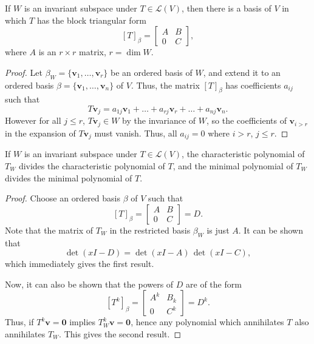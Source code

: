 \documentclass[11pt]{article}
\renewcommand{\vec}[1]{\boldsymbol{#1}}
\newcommand{\vv}{\vec{v}}
\newcommand{\alg}[1]{\mathscr{#1}}
\newcommand{\algL}{\alg{L}}
\newcommand{\dim}{\operatorname{dim}}
\theoremstyle{definition}
\theoremstyle{remark}
\numberwithin{equation}{section}
\begin{document}
    \begin{lemma}
        If $W$ is an invariant subspace under $T \in \algL(V)$, then there is a basis of
        $V$ in which $T$ has the block triangular form \[
            [T]_\beta = \begin{bmatrix}
                A & B \\ 0 & C
            \end{bmatrix},
        \] where $A$ is an $r \times r$ matrix, $r = \dim{W}$.
    \end{lemma}
    \begin{proof}
        Let $\beta_W = \{\vv_1, \dots, \vv_r\}$ be an ordered basis of $W$, and
        extend it to an ordered basis $\beta = \{\vv_1, \dots, \vv_n\}$ of $V$. Thus,
        the matrix $[T]_\beta$ has coefficients $a_{ij}$ such that \[
            T\vv_j = a_{1j}\vv_1 + \dots  + a_{rj}\vv_r + \dots + a_{nj}\vv_n.
        \] However for all $j \leq r$, $T\vv_j \in W$ by the invariance of $W$, so
        the coefficients of $\vv_{i > r}$ in the expansion of $T\vv_j$ must vanish.
        Thus, all $a_{ij} = 0$ where $i > r$, $j \leq r$.
    \end{proof}

    \begin{lemma}
        If $W$ is an invariant subspace under $T \in \algL(V)$, the characteristic
        polynomial of $T_W$ divides the characteristic polynomial of $T$, and the
        minimal polynomial of $T_W$ divides the minimal polynomial of $T$.
    \end{lemma}
    \begin{proof}
        Choose an ordered basis $\beta$ of $V$ such that \[
            [T]_\beta = \begin{bmatrix}
                A & B \\ 0 & C
            \end{bmatrix} = D.
        \] Note that the matrix of $T_W$ in the restricted basis $\beta_W$ is just
        $A$. It can be shown that \[
            \det(xI - D) = \det(xI - A)\,\det(xI - C),
        \] which immediately gives the first result.

        Now, it can also be shown that the powers of $D$ are of the form \[
            [T^k]_\beta = \begin{bmatrix}
                A^k & B_k \\ 0 & C^k
            \end{bmatrix} = D^k.
        \] Thus, if $T^k\vv = \vec{0}$ implies $T_W^k\vv = \vec{0}$, hence any
        polynomial which annihilates $T$ also annihilates $T_W$. This gives the
        second result.
    \end{proof}
\end{document}
